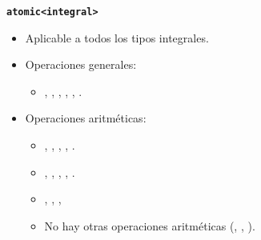 \begin{frame}[t,fragile]{\texttt{\textbf{atomic<integral>}}}
\begin{itemize}
  \item Aplicable a todos los tipos integrales.
  \item Operaciones generales:
    \begin{itemize}
      \item {}, , , , 
            , .
    \end{itemize}
  \item Operaciones aritméticas:
    \begin{itemize}
      \item {}, , , , .
      \item \cppid{+=}, \cppid{-=}, \cppid{\&=}, \cppid{|=}, \cppid{\^{}=}.
      \item {}, , , 
      \item No hay otras operaciones aritméticas (\cppid{*}, \cppid{/}, \cppid{\%}).
    \end{itemize}
\end{itemize}
\end{frame}

